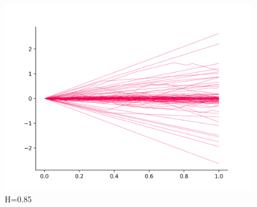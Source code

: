 \documentclass[a4paper,12pt]{article}
\numberwithin{equation}{section}
\begin{document}
	\begin{figure}[H]
		\center
		\includegraphics[scale=0.4]{image-2-85.png}
		\caption{H=0.85}
	\end{figure}
	
\end{document}
